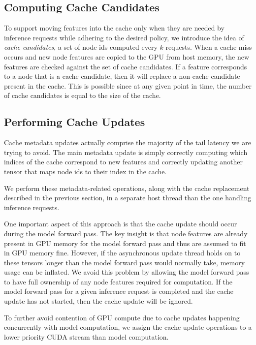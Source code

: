 \subsection{Computing Cache Candidates} \label{Design: Cache candidates}
To support moving features into the cache only when they are needed by inference requests while adhering to the desired policy, we introduce the idea of \textit{cache candidates}, a set of node ids computed every $k$ requests. When a cache miss occurs and new node features are copied to the GPU from host memory, the new features are checked against the set of cache candidates. If a feature corresponds to a node that is a cache candidate, then it will replace a non-cache candidate present in the cache. This is possible since at any given point in time, the number of cache candidates is equal to the size of the cache.


\subsection{Performing Cache Updates}
Cache metadata updates actually comprise the majority of the tail latency we are trying to avoid. 
The main metadata update is simply correctly computing which indices of the cache correspond to new features and correctly updating another tensor that maps node ids to their index in the cache.

We perform these metadata-related operations, along with the cache replacement described in the previous section, in a separate host thread than the one handling inference requests. 

One important aspect of this approach is that the cache update should occur during the model forward pass.
The key insight is that node features are already present in GPU memory for the model forward pass and thus are assumed to fit in GPU memory fine.
However, if the asynchronous update thread holds on to these tensors longer than the model forward pass would normally take, memory usage can be inflated. 
We avoid this problem by allowing the model forward pass to have full ownership of any node features required for computation.
If the model forward pass for a given inference request is completed and the cache update has not started, then the cache update will be ignored.

To further avoid contention of GPU compute due to cache updates happening concurrently with model computation, we assign the cache update operations to a lower priority CUDA stream than model computation.


